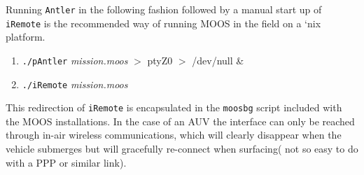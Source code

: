 \documentclass[a4paper,10pt]{article}
\newcommand{\Code}[1]{\texttt{#1} }
\newcommand{\code}[1]{\Code{#1} }
\begin{document}
Running \code{Antler} in the following fashion followed by a
manual start up of \code{iRemote} is the recommended way of
running MOOS in the field on a `nix platform.

\begin{enumerate}
\item \code{./pAntler} {\it{mission.moos}} $>$ ptyZ0 $>$ /dev/null \&
\item \code{./iRemote} {\it{mission.moos}}
\end{enumerate}

This redirection of \code{iRemote} is encapsulated in the
\code{moosbg} script included with the MOOS installations. In the
case of an AUV the interface can only be reached  through in-air
wireless communications, which will clearly disappear when the
vehicle submerges but will gracefully re-connect when surfacing(
not so easy to do with a PPP or similar link). 
\end{document}
